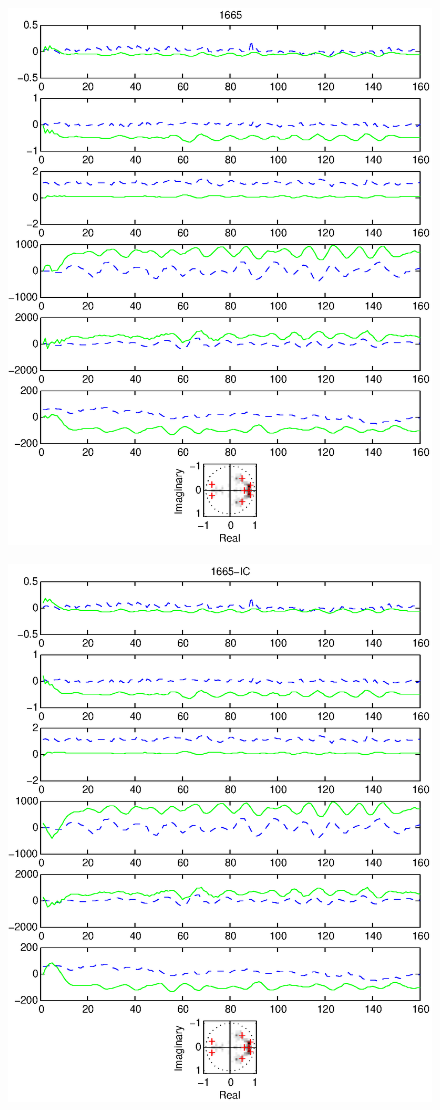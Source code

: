 \documentclass{article}
\begin{document}
\begin{figure}[htb!]
\centering
\includegraphics{1665.eps}
\end{figure}\clearpage
\begin{figure}[htb!]
\centering
\includegraphics{1665_ic.eps}
\end{figure}\clearpage
\end{document}
